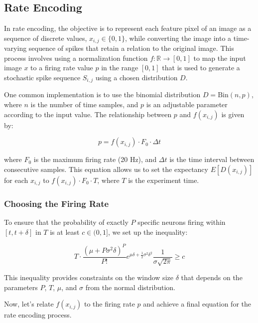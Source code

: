 \subsection{Rate Encoding}

In rate encoding, the objective is to represent each feature pixel of an image as a sequence of discrete values, \(x_{i,j} \in \{0, 1\}\), while converting the image into a time-varying sequence of spikes that retain a relation to the original image. This process involves using a normalization function \(f: \mathbb{R} \rightarrow [0, 1]\) to map the input image \(x\) to a firing rate value \(p\) in the range \([0, 1]\) that is used to generate a stochastic spike sequence \(S_{i,j}\) using a chosen distribution \(D\).

One common implementation is to use the binomial distribution \(D = \text{Bin}(n, p)\), where \(n\) is the number of time samples, and \(p\) is an adjustable parameter according to the input value. The relationship between \(p\) and \(f(x_{i,j})\) is given by:

\begin{equation}
    p = f(x_{i,j}) \cdot F_0 \cdot \Delta t 
\end{equation}

where \(F_0\) is the maximum firing rate (20 Hz), and \(\Delta t\) is the time interval between consecutive samples. This equation allows us to set the expectancy \(E[D(x_{i,j})]\) for each \(x_{i,j}\) to \(f(x_{i,j}) \cdot F_0 \cdot T\), where \(T\) is the experiment time.

\subsubsection{Choosing the Firing Rate}

To ensure that the probability of exactly \(P\) specific neurons firing within \([t, t + \delta]\) in \(T\) is at least \(c \in (0, 1]\), we set up the inequality:

\begin{equation}
T \cdot \frac{(\mu + P\sigma^2\delta)^P}{P!} e^{\mu\delta + \frac{1}{2}\sigma^2 \delta^2} \frac{1}{\sigma \sqrt{2\pi}} \geq c
\end{equation}

This inequality provides constraints on the window size \(\delta\) that depends on the parameters \(P\), \(T\), \(\mu\), and \(\sigma\) from the normal distribution. 

Now, let's relate \(f(x_{i,j})\) to the firing rate \(p\) and achieve a final equation for the rate encoding process.

